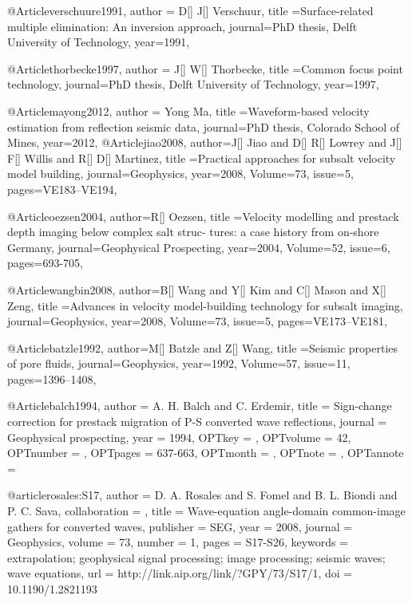 @Article{verschuure1991,
  author = {D[] J[] Verschuur},
  title ={Surface-related multiple elimination: An inversion approach},
  journal={PhD thesis, Delft University of Technology},
  year=1991,
}

@Article{thorbecke1997,
  author = {J[] W[] Thorbecke},
  title ={Common focus point technology},
  journal={PhD thesis, Delft University of Technology},
  year=1997,
}

@Article{mayong2012,
  author = {Yong Ma},
  title ={Waveform-based velocity estimation from reflection seismic data},
  journal={PhD thesis, Colorado School of Mines},
  year=2012,
}
@Article{jiao2008,
  author={J[] Jiao and D[] R[] Lowrey and J[] F[] Willis and R[] D[] Martinez},
  title ={Practical approaches for subsalt velocity model building},
  journal={Geophysics},
  year=2008,
  Volume=73,
  issue=5,
  pages={VE183–VE194},
}

@Article{oezsen2004,
  author={R[] Oezsen},
  title ={Velocity modelling and prestack depth imaging below complex salt struc-
tures: a case history from on-shore Germany},
  journal={Geophysical Prospecting},
  year=2004,
  Volume=52,
  issue=6,
  pages={693-705},
}

@Article{wangbin2008,
  author={B[] Wang and Y[] Kim and C[] Mason and X[] Zeng},
  title ={Advances in velocity model-building technology for subsalt imaging},
  journal={Geophysics},
  year=2008,
  Volume=73,
  issue=5,
  pages={VE173–VE181},
}

@Article{batzle1992,
  author={M[] Batzle and Z[] Wang},
  title ={Seismic properties of pore fluids},
  journal={Geophysics},
  year=1992,
  Volume=57,
  issue=11,
  pages={1396–1408},
}

@Article{balch1994,
  author = 	 {A. H. Balch and C. Erdemir},
  title = 	 {Sign-change correction for prestack migration of P-S
                  converted wave reflections},
  journal = 	 {Geophysical prospecting},
  year = 	 {1994},
  OPTkey = 	 {},
  OPTvolume = 	 {42},
  OPTnumber = 	 {},
  OPTpages = 	 {637-663},
  OPTmonth = 	 {},
  OPTnote = 	 {},
  OPTannote = 	 {}
}


@article{rosales:S17,
author = {D. A. Rosales and S. Fomel and B. L. Biondi and P. C. Sava},
collaboration = {},
title = {Wave-equation angle-domain common-image gathers for converted waves},
publisher = {SEG},
year = {2008},
journal = {Geophysics},
volume = {73},
number = {1},
pages = {S17-S26},
keywords = {extrapolation; geophysical signal processing; image processing; seismic waves; wave equations},
url = {http://link.aip.org/link/?GPY/73/S17/1},
doi = {10.1190/1.2821193}
}

